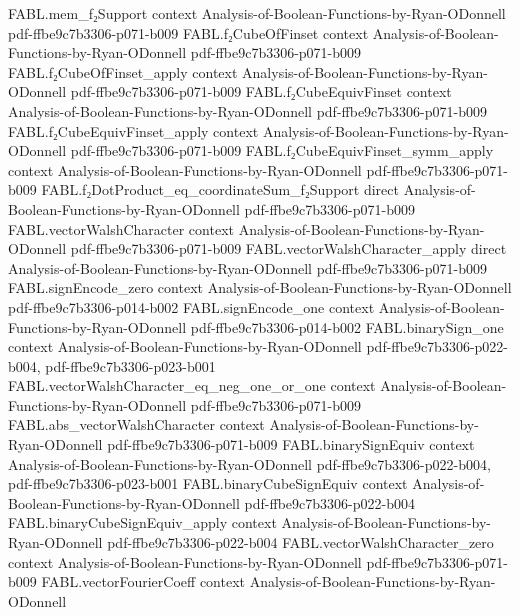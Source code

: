 \begin{theorem}
  {FABL.mem_f₂Support}
  {context}
  {Analysis-of-Boolean-Functions-by-Ryan-ODonnell}
  {pdf-ffbe9c7b3306-p071-b009}
\proofstep
  {FABL.f₂CubeOfFinset}
  {context}
  {Analysis-of-Boolean-Functions-by-Ryan-ODonnell}
  {pdf-ffbe9c7b3306-p071-b009}
\proofstep
  {FABL.f₂CubeOfFinset_apply}
  {context}
  {Analysis-of-Boolean-Functions-by-Ryan-ODonnell}
  {pdf-ffbe9c7b3306-p071-b009}
\proofstep
  {FABL.f₂CubeEquivFinset}
  {context}
  {Analysis-of-Boolean-Functions-by-Ryan-ODonnell}
  {pdf-ffbe9c7b3306-p071-b009}
\proofstep
  {FABL.f₂CubeEquivFinset_apply}
  {context}
  {Analysis-of-Boolean-Functions-by-Ryan-ODonnell}
  {pdf-ffbe9c7b3306-p071-b009}
\proofstep
  {FABL.f₂CubeEquivFinset_symm_apply}
  {context}
  {Analysis-of-Boolean-Functions-by-Ryan-ODonnell}
  {pdf-ffbe9c7b3306-p071-b009}
\proofstep
  {FABL.f₂DotProduct_eq_coordinateSum_f₂Support}
  {direct}
  {Analysis-of-Boolean-Functions-by-Ryan-ODonnell}
  {pdf-ffbe9c7b3306-p071-b009}
\proofstep
  {FABL.vectorWalshCharacter}
  {context}
  {Analysis-of-Boolean-Functions-by-Ryan-ODonnell}
  {pdf-ffbe9c7b3306-p071-b009}
\proofstep
  {FABL.vectorWalshCharacter_apply}
  {direct}
  {Analysis-of-Boolean-Functions-by-Ryan-ODonnell}
  {pdf-ffbe9c7b3306-p071-b009}
\proofstep
  {FABL.signEncode_zero}
  {context}
  {Analysis-of-Boolean-Functions-by-Ryan-ODonnell}
  {pdf-ffbe9c7b3306-p014-b002}
\proofstep
  {FABL.signEncode_one}
  {context}
  {Analysis-of-Boolean-Functions-by-Ryan-ODonnell}
  {pdf-ffbe9c7b3306-p014-b002}
\proofstep
  {FABL.binarySign_one}
  {context}
  {Analysis-of-Boolean-Functions-by-Ryan-ODonnell}
  {pdf-ffbe9c7b3306-p022-b004,
    pdf-ffbe9c7b3306-p023-b001}
\proofstep
  {FABL.vectorWalshCharacter_eq_neg_one_or_one}
  {context}
  {Analysis-of-Boolean-Functions-by-Ryan-ODonnell}
  {pdf-ffbe9c7b3306-p071-b009}
\proofstep
  {FABL.abs_vectorWalshCharacter}
  {context}
  {Analysis-of-Boolean-Functions-by-Ryan-ODonnell}
  {pdf-ffbe9c7b3306-p071-b009}
\proofstep
  {FABL.binarySignEquiv}
  {context}
  {Analysis-of-Boolean-Functions-by-Ryan-ODonnell}
  {pdf-ffbe9c7b3306-p022-b004,
    pdf-ffbe9c7b3306-p023-b001}
\proofstep
  {FABL.binaryCubeSignEquiv}
  {context}
  {Analysis-of-Boolean-Functions-by-Ryan-ODonnell}
  {pdf-ffbe9c7b3306-p022-b004}
\proofstep
  {FABL.binaryCubeSignEquiv_apply}
  {context}
  {Analysis-of-Boolean-Functions-by-Ryan-ODonnell}
  {pdf-ffbe9c7b3306-p022-b004}
\proofstep
  {FABL.vectorWalshCharacter_zero}
  {context}
  {Analysis-of-Boolean-Functions-by-Ryan-ODonnell}
  {pdf-ffbe9c7b3306-p071-b009}
\proofstep
  {FABL.vectorFourierCoeff}
  {context}
  {Analysis-of-Boolean-Functions-by-Ryan-ODonnell}

\end{theorem}
